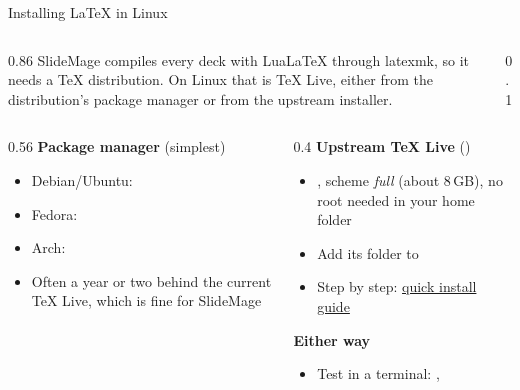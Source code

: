 

\begin{standardframe}{Installing LaTeX in Linux}
	\small
	\begin{columns}[c,onlytextwidth]
		\begin{column}{0.86\linewidth}
			SlideMage compiles every deck with LuaLaTeX through latexmk, so it needs a
			TeX distribution. On Linux that is TeX Live, either from the distribution's
			package manager or from the upstream installer.
		\end{column}
		\begin{column}{0.1\linewidth}
			\raggedleft{\fontsize{34}{34}\selectfont\faLinux}
		\end{column}
	\end{columns}
	\par
	\begin{columns}[T,onlytextwidth]
		\begin{column}{0.56\linewidth}
			\textbf{Package manager} (simplest)
			\begin{itemize}
				\item Debian/Ubuntu: 
				\item Fedora: 
				\item Arch: 
				\item Often a year or two behind the current TeX Live, which is fine for SlideMage
			\end{itemize}
		\end{column}
		\begin{column}{0.4\linewidth}
			\textbf{Upstream TeX Live} ()
			\begin{itemize}
				\item {}, scheme \emph{full} (about 8\,GB), no root needed in your home folder
				\item Add its  folder to 
				\item Step by step: \href{https://tug.org/texlive/quickinstall.html}{quick install guide}
			\end{itemize}
			\medskip
			\textbf{Either way}
			\begin{itemize}
				\item Test in a terminal: , 
			\end{itemize}
		\end{column}
	\end{columns}
\end{standardframe}
